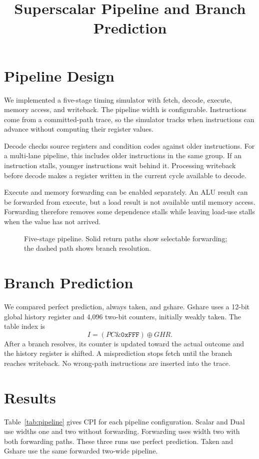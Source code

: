 \documentclass{article}
\title{Superscalar Pipeline and Branch Prediction}
\author{}
\date{}
\begin{document}
\maketitle


\section{Pipeline Design}
We implemented a five-stage timing simulator with fetch, decode, execute, memory access, and writeback. The pipeline width is configurable. Instructions come from a committed-path trace, so the simulator tracks when instructions can advance without computing their register values.

Decode checks source registers and condition codes against older instructions. For a multi-lane pipeline, this includes older instructions in the same group. If an instruction stalls, younger instructions wait behind it. Processing writeback before decode makes a register written in the current cycle available to decode.

Execute and memory forwarding can be enabled separately. An ALU result can be forwarded from execute, but a load result is not available until memory access. Forwarding therefore removes some dependence stalls while leaving load-use stalls when the value has not arrived.


\begin{figure}[H]\centering

\caption{Five-stage pipeline. Solid return paths show selectable forwarding; the dashed path shows branch resolution.}\label{fig:architecture}
\end{figure}

\section{Branch Prediction}
We compared perfect prediction, always taken, and gshare. Gshare uses a 12-bit global history register and 4,096 two-bit counters, initially weakly taken. The table index is
\[
I=(PC\mathbin{\&}\texttt{0xFFF})\oplus GHR.
\]
After a branch resolves, its counter is updated toward the actual outcome and the history register is shifted. A misprediction stops fetch until the branch reaches writeback. No wrong-path instructions are inserted into the trace.

\section{Results}
Table~\ref{tab:pipeline} gives CPI for each pipeline configuration. Scalar and Dual use widths one and two without forwarding. Forwarding uses width two with both forwarding paths. These three runs use perfect prediction. Taken and Gshare use the same forwarded two-wide pipeline.
\end{document}
